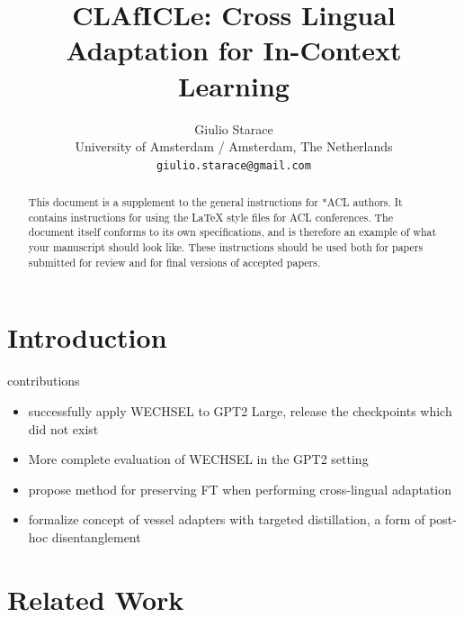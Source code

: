 \documentclass[11pt]{article}
\title{CLAfICLe: Cross Lingual Adaptation for In-Context Learning}
\author{Giulio Starace \\
  University of Amsterdam / Amsterdam, The Netherlands \\
  \texttt{giulio.starace@gmail.com} \\}
\begin{document}
\maketitle
\begin{abstract}
	This document is a supplement to the general instructions for *ACL authors. It contains instructions for using the \LaTeX{} style files for ACL conferences.
	The document itself conforms to its own specifications, and is therefore an example of what your manuscript should look like.
	These instructions should be used both for papers submitted for review and for final versions of accepted papers.
\end{abstract}

\section{Introduction}

contributions
\begin{itemize}
	\item successfully apply WECHSEL to GPT2 Large, release the checkpoints which did not exist
	\item More complete evaluation of WECHSEL in the GPT2 setting
	\item propose method for preserving FT when performing cross-lingual adaptation
	\item formalize concept of vessel adapters with targeted distillation, a form of post-hoc disentanglement
\end{itemize}

\section{Related Work}
\end{document}
